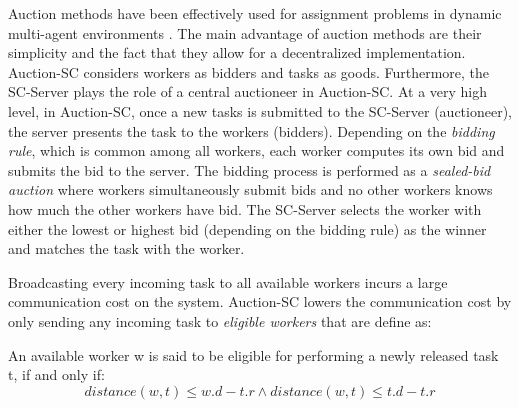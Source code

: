 

Auction methods have been effectively used for assignment problems in dynamic multi-agent environments \cite{Mehta05,Lagoudakis04}. The main advantage of auction methods are their simplicity and the fact that they allow for a decentralized implementation. Auction-SC considers workers as bidders and tasks as goods. Furthermore, the SC-Server plays the role of a central auctioneer in Auction-SC. At a very high level, in Auction-SC, once a new tasks is submitted to the SC-Server (auctioneer), the server presents the task to the workers (bidders). Depending on the \textit{bidding rule}, which is common among all workers, each worker computes its own bid and submits the bid to the server. The bidding process is performed as a \textit{sealed-bid auction} where workers simultaneously submit bids and no other workers knows how much the other workers have bid. The SC-Server selects the worker with either the lowest or highest bid (depending on the bidding rule) as the winner and matches the task with the worker.

Broadcasting every incoming task to all available workers incurs a large communication cost on the system. Auction-SC lowers the communication cost by only sending any incoming task to \textit{eligible workers} that are define as:

\begin{definition} 
An available worker w is said to be eligible for performing a newly released task t, if and only if:
\begin{equation*}
distance(w, t) \leq w.d - t.r \wedge distance(w, t) \leq t.d - t.r
\end{equation*}
\end{definition}

